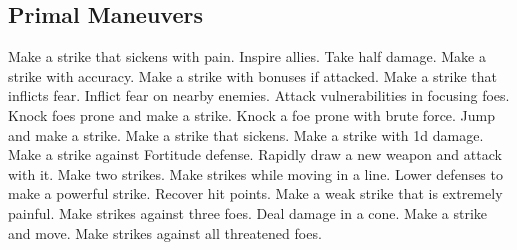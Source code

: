 \subsection{Primal Maneuvers}\label{Primal Maneuvers}
\begin{spelllist}
 Make a strike that sickens with pain.
 Inspire allies.
 Take half damage.
 Make a strike with  accuracy.
 Make a strike with bonuses if attacked.
 Make a strike that inflicts fear.
 Inflict fear on nearby enemies.
 Attack vulnerabilities in focusing foes.
 Knock foes prone and make a strike.
 Knock a foe prone with brute force.
 Jump and make a strike.
 Make a strike that sickens.
 Make a strike with \plus1d damage.
 Make a strike against Fortitude defense.
 Rapidly draw a new weapon and attack with it.
 Make two strikes.
 Make strikes while moving in a line.
 Lower defenses to make a powerful strike.
 Recover hit points.
 Make a weak strike that is extremely painful.
 Make strikes against three foes.
 Deal damage in a cone.
 Make a strike and move.
 Make strikes against all threatened foes.
\end{spelllist}



\small
